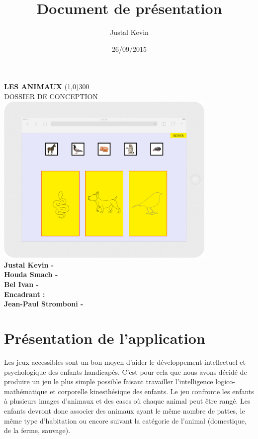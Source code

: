 \documentclass{article}
\title{Document de pr\'esentation}
\author{Justal Kevin}
\date{26/09/2015}
\begin{document}
\begin{center}
\textbf{\Huge{LES ANIMAUX}}
\line(1,0){300}\\
DOSSIER DE CONCEPTION\\
\vspace{3cm}
\includegraphics[width=0.8\textwidth]{tablette}\\
\vspace{3cm}
\textbf{Justal Kevin -  \color{black}{- SI5 - IHM}}\\
\textbf{Houda Smach -  \color{black}{- SSTIM }}\\
\textbf{Bel Ivan -  \color{black}{- SSTIM }}\\
\vspace{4cm}
\textbf{Encadrant :}\\
\textbf{Jean-Paul Stromboni - }
\end{center}

\newpage
\tableofcontents

\newpage

\section{Pr\'esentation de l'application}
\hspace*{0.6cm}Les jeux accessibles sont un bon moyen d'aider le d\'eveloppement intellectuel et psychologique des enfants handicap\'es. C'est pour cela que nous avons d\'ecid\'e de produire un jeu le plus simple possible faisant travailler l'intelligence logico-math\'ematique et corporelle kinesth\'esique des enfants. Le jeu confronte les enfants \`a plusieurs images d'animaux et des cases o\`u chaque animal peut \^etre rang\'e. Les enfants devront donc associer des animaux ayant le m\^eme nombre de pattes, le m\^eme type d'habitation ou encore suivant la cat\'egorie de l'animal (domestique, de la ferme, sauvage).
\end{document}

